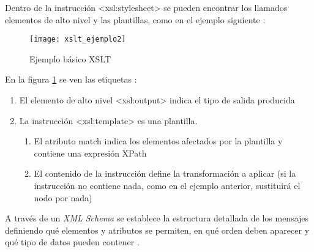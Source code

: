 Dentro de la instrucción <xsl:stylesheet> se pueden encontrar los llamados elementos de alto nivel y las plantillas, como en el ejemplo siguiente \cite{XSLT:definiciones}:
  \begin{figure}[h]
    \centering
    \texttt{[image: xslt\_ejemplo2]}
    \caption{Ejemplo básico XSLT}
    \label{figura:xslt_ejemplo2}
  \end{figure}
En la figura \ref{figura:xslt_ejemplo2} se ven las etiquetas \cite{XSLT:definiciones}:
 				\begin{enumerate}
				\item El elemento de alto nivel <xsl:output> indica el tipo de salida producida
				\item La instrucción <xsl:template> es una plantilla.
					\begin{enumerate}
					\item El atributo match indica los elementos afectados por la plantilla y contiene una expresión XPath
					\item El contenido de la instrucción define la transformación a aplicar (si la instrucción no contiene nada, como en el ejemplo anterior, sustituirá el nodo por nada)
					\end{enumerate}
				\end{enumerate}
A través de un \emph{XML Schema} se establece la estructura detallada de los mensajes definiendo qué elementos y atributos se permiten, en qué orden deben aparecer y qué tipo de datos pueden contener \citep{Tesis:LauraGonzalez:PlataformaESB,XML:W3C}.
